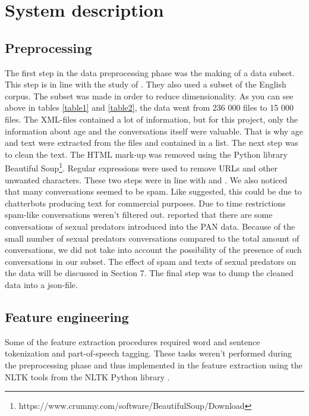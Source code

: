 \documentclass{clv3}
\begin{document}
\section{System description}
\subsection{Preprocessing}
The first step in the data preprocessing phase was the making of a data subset. This step is in line with the study of \citet{patra2013automatic}. They also used a subset of the English corpus. The subset was made in order to reduce dimensionality. As you can  see above in tables \ref{table1} and \ref{table2}, the data went from 236 000 files to 15 000 files.  The XML-files contained a lot of information, but for this project, only the information about age and the conversations itself were valuable. That is why age and text were extracted from the files and contained in a list. The next step was to clean the text. The HTML mark-up was removed using the Python library Beautiful Soup\footnote{https://www.crummy.com/software/BeautifulSoup/Download}.  Regular expressions were used to remove URLs and other unwanted characters. These two steps were in line with \citet{meina2013ensemble} and \citet{patra2013automatic}. We also noticed that many conversations seemed to be spam. Like \citeauthor{meina2013ensemble} suggested, this could be due to chatterbots producing  text for commercial purposes. Due to time restrictions spam-like conversations weren't filtered out. \citet{rangel2013overview} reported that there are some conversations of sexual predators introduced into the PAN data. Because of the small number of sexual predators conversations compared to the total amount of conversations, we did not take into account the possibility of  the presence of such conversations in our subset. The effect of spam and texts of sexual predators on the data will be discussed in Section 7. The final step was to dump the cleaned data into a json-file.

\subsection{Feature engineering}
Some of the feature extraction procedures required word and sentence tokenization and part-of-speech tagging. These tasks weren't performed during the preprocessing phase and thus implemented in the feature extraction using the NLTK tools from the NLTK Python library \citep{bird2009natural}.
\end{document}
